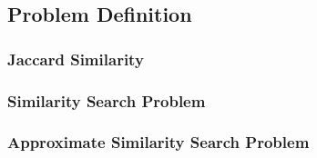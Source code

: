\subsection{Problem Definition}

\subsubsection{Jaccard Similarity}

\subsubsection{Similarity Search Problem}

\subsubsection{Approximate Similarity Search Problem}

